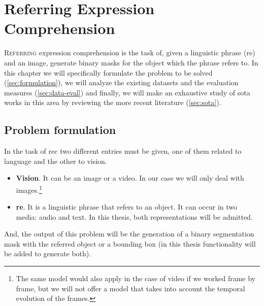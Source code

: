 

\chapter{Referring Expression Comprehension}%
\label{cha:rec}


\lettrine{R}{eferring} expression comprehension is the task of, given a
linguistic phrase (\gls{re}) and an image, generate binary masks for the object
which the phrase refers to. In this chapter we will specifically formulate the
problem to be solved (\vref{sec:formulation}), we will analyze the existing
datasets and the evaluation measures (\vref{sec:data-eval}) and finally, we
will make an exhaustive study of \gls{sota} works in this area by reviewing the
more recent literature (\vref{sec:sota}).


\section{Problem formulation}\label{sec:formulation}

In the task of \gls{rec} two different entries must be given, one of them
related to language and the other to vision.
\begin{itemize}
  \item \textbf{Vision}. It can be an image or a video. In our case we will
  only deal with images.\footnote{The same model would also apply in the case
    of video if we worked frame by frame, but we will not offer a model that
    takes into account the temporal evolution of the frames.}
  \item \textbf{\gls{re}}. It is a linguistic phrase that refers to an
  object. It can occur in two media: audio and text. In this thesis, both
  representations will be admitted.
\end{itemize}
And, the output of this problem will be the generation of a binary segmentation
mask with the referred object or a bounding box (in this thesis functionality
will be added to generate both).

